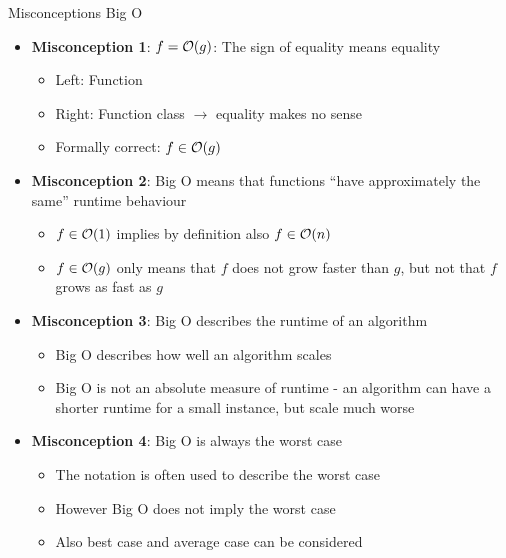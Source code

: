 
%









\begin{vbframe}{Misconceptions Big O}

\begin{itemize}

\item \textbf{Misconception 1}: $f = \mathcal{O}(g)$: The sign of equality means equality \\
  \begin{itemize}
  \item Left: Function
  \item Right: Function class $\to$ equality makes no sense
  \item Formally correct: $f \in \mathcal{O}(g)$
  \end{itemize}

\item \textbf{Misconception 2}: Big O means that functions \enquote{have approximately the same} runtime behaviour
  \begin{itemize}
  \item $f \in \mathcal{O}(1)$ implies by definition also $f \in \mathcal{O}(n)$
  \item $f \in \mathcal{O}(g)$ only means that $f$ does not grow faster than $g$, but not that $f$ grows as fast as $g$
  \end{itemize}
  \framebreak
\item \textbf{Misconception 3}: Big O describes the runtime of an algorithm
  \begin{itemize}
  \item Big O describes how well an algorithm scales
  \item Big O is not an absolute measure of runtime - an algorithm can have a shorter runtime for a small instance, but scale much worse
  \end{itemize}
\item \textbf{Misconception 4}: Big O is always the worst case
  \begin{itemize}
  \item The notation is often used to describe the worst case
  \item However Big O does not imply the worst case
  \item Also best case and average case can be considered
  \end{itemize}
\end{itemize}
\end{vbframe}


